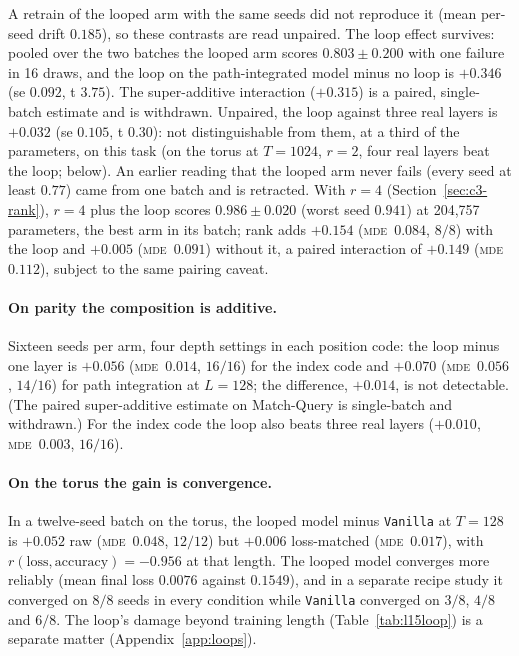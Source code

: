\documentclass[10pt]{article}
\newcommand{\mde}{\textsc{mde}}
\newcommand{\arm}[1]{\texttt{#1}}
\begin{document}
A retrain of the looped arm with the same seeds did not reproduce it (mean per-seed drift $0.185$), so these
contrasts are read unpaired. The loop effect survives: pooled over the two batches the looped arm scores
$0.803\pm0.200$ with one failure in 16 draws, and the loop on the path-integrated model minus no loop is $+0.346$ (se $0.092$, t $3.75$). The
super-additive interaction ($+0.315$) is a paired, single-batch estimate and is withdrawn. Unpaired,
the loop against three real layers is $+0.032$ (se $0.105$, t $0.30$): not distinguishable from them, at a
third of the parameters, on this task (on the torus at $T=1024$, $r=2$, four real layers beat the loop; below). An earlier reading that the looped arm never fails (every seed at least $0.77$) came from
one batch and is retracted. With $r=4$ (Section~\ref{sec:c3-rank}), $r=4$ plus the loop scores
$0.986\pm0.020$ (worst seed $0.941$) at 204,757 parameters, the best arm in its batch; rank adds $+0.154$ (\mde\
$0.084$, $8/8$) with the loop and $+0.005$ (\mde\ $0.091$) without it, a paired interaction of $+0.149$ (\mde\
$0.112$), subject to the same pairing caveat. %

\paragraph{On parity the composition is additive.} Sixteen seeds per arm, four depth settings in each
position code: the loop minus one layer is $+0.056$ (\mde\ $0.014$, $16/16$) for the index code and
$+0.070$ (\mde\ $0.056$, $14/16$) for path integration at $L=128$; the difference, $+0.014$, is not
detectable. (The paired super-additive estimate on Match-Query is single-batch and withdrawn.) For the index code the loop also beats three
real layers ($+0.010$, \mde\ $0.003$, $16/16$). %

\paragraph{On the torus the gain is convergence.} In a twelve-seed batch on the torus, the looped model
minus \arm{Vanilla} at $T=128$ is $+0.052$ raw (\mde\ $0.048$, $12/12$) but $+0.006$ loss-matched (\mde\
$0.017$), with $r(\text{loss},\text{accuracy})=-0.956$ at that length. The looped model converges more
reliably (mean final loss $0.0076$ against $0.1549$), and in a separate recipe study it converged on $8/8$
seeds in every condition while \arm{Vanilla} converged on $3/8$, $4/8$ and $6/8$. The loop's damage beyond
training length (Table~\ref{tab:l15loop}) is a separate matter (Appendix~\ref{app:loops}).
\end{document}
